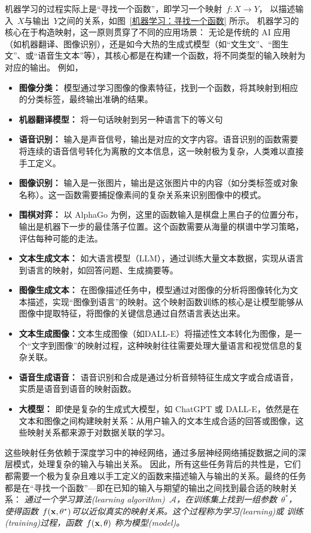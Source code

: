 机器学习的过程实际上是“寻找一个函数”，即学习一个映射~$f: X \rightarrow Y$， 以描述输入~$X$与输出~$Y$之间的关系，如图~\ref{机器学习：寻找一个函数} 所示。
机器学习的核心在于构造映射，这一原则贯穿了不同的应用场景：
无论是传统的 AI 应用（如机器翻译、图像识别），还是如今大热的生成式模型（如“文生文”、“图生文”、或“语音生文本”等），其核心都是在构建一个函数，将不同类型的输入映射为对应的输出。
例如，
\begin{itemize}
\item {\bf 图像分类：} 模型通过学习图像的像素特征，找到一个函数，将其映射到相应的分类标签，最终输出准确的结果。
\item {\bf 机器翻译模型：} 将一句话映射到另一种语言下的等义句
\item {\bf 语音识别：} 输入是声音信号，输出是对应的文字内容。语音识别的函数需要将连续的语音信号转化为离散的文本信息，这一映射极为复杂，人类难以直接手工定义。
\item {\bf  图像识别：} 输入是一张图片，输出是这张图片中的内容（如分类标签或对象名称）。这一函数需要捕捉像素间的复杂关系来识别图像中的模式。
\item {\bf 围棋对弈：} 以 AlphaGo 为例，这里的函数输入是棋盘上黑白子的位置分布，输出是机器下一步的最佳落子位置。这个函数需要从海量的棋谱中学习策略，评估每种可能的走法。
\item {\bf 文本生成文本：} 如大语言模型（LLM），通过训练大量文本数据，实现从语言到语言的映射，如回答问题、生成摘要等。
\item {\bf 图像生成文本：} 在图像描述任务中，模型通过对图像的分析将图像转化为文本描述，实现“图像到语言”的映射。这个映射函数训练的核心是让模型能够从图像中提取特征，将图像的关键信息通过自然语言表达出来。
\item {\bf 文本生成图像：}文本生成图像（如DALL-E）将描述性文本转化为图像，是一个“文字到图像”的映射过程，这种映射往往需要处理大量语言和视觉信息的复杂关联。
\item {\bf 语音生成语音：} 语音识别和合成是通过分析音频特征生成文字或合成语音，实质是语音到语音的映射函数。
\item {\bf 大模型：} 即使是复杂的生成式大模型，如 ChatGPT 或 DALL-E，依然是在文本和图像之间构建映射关系：从用户输入的文本生成合适的回答或图像，这些映射关系都来源于对数据关联的学习。
\end{itemize}

这些映射任务依赖于深度学习中的神经网络，通过多层神经网络捕捉数据之间的深层模式，处理复杂的输入与输出关系。
因此，所有这些任务背后的共性是，它们都需要一个极为复杂且难以手工定义的函数来描述输入与输出的关系。最终的任务都是在“寻找一个函数”---即在已知的输入与期望的输出之间找到最合适的映射关系：
{\em 通过一个学习算法(learning algorithm)~$\mathcal{A}$，在训练集上找到一组参数~$\theta^\ast$， 使得函数~$f({\bf x}, \theta^\ast)$可以近似真实的映射关系。这个过程称为学习(learning)或 训练(training)过程，函数~$f({\bf x}, \theta)$ 称为模型(model)。}


